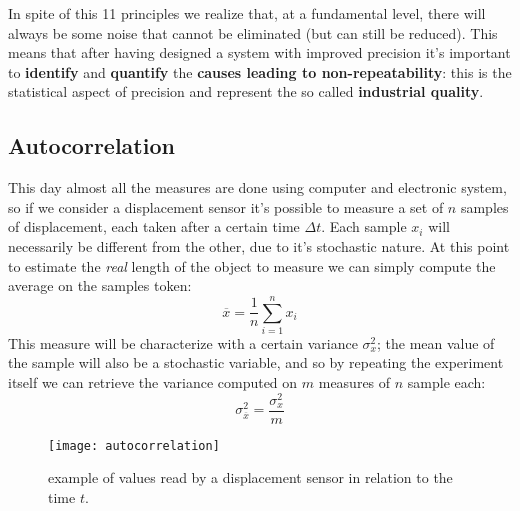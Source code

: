 	In spite of this 11 principles we realize that, at a fundamental level, there will always be some noise that cannot be eliminated (but can still be reduced). This means that after having designed a system with improved precision it's important to \textbf{identify} and \textbf{quantify} the \textbf{causes leading to non-repeatability}: this is the statistical aspect of precision and represent the so called \textbf{industrial quality}.
	
	\subsection{Autocorrelation}
	
		This day almost all the measures are done using computer and electronic system, so if we consider a displacement sensor it's possible to measure a set of $n$ samples of displacement, each taken after a certain time $\Delta t$. Each sample $x_i$ will necessarily be different from the other, due to it's stochastic nature. At this point to estimate the \textit{real} length of the object to measure we can simply compute the average on the samples token:
		\begin{equation}
			\overline x = \frac 1 n \sum_{i=1} ^n x_i	
		\end{equation}
		This measure will be characterize with a certain variance $\sigma_x^2$; the mean value of the sample will also be a stochastic variable, and so by repeating the experiment itself we can retrieve the variance computed on $m$ measures of $n$ sample each:
		\begin{equation} 
			\sigma^2_{\overline x} = \frac{\sigma_x^2}{m}
		\end{equation}
		
		\begin{SCfigure}[1][bht]
			\centering \texttt{[image: autocorrelation]}
			\caption{example of values read by a displacement sensor in relation to the time $t$.} \label{fig:design:correlation}
		\end{SCfigure}
	
